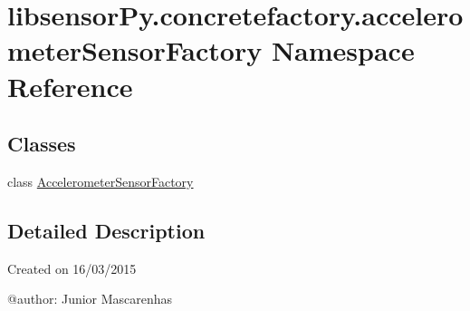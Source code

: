 \hypertarget{namespacelibsensorPy_1_1concretefactory_1_1accelerometerSensorFactory}{}\section{libsensor\+Py.\+concretefactory.\+accelerometer\+Sensor\+Factory Namespace Reference}
\label{namespacelibsensorPy_1_1concretefactory_1_1accelerometerSensorFactory}
\subsection*{Classes}
\begin{DoxyCompactItemize}
\item 
class \hyperlink{classlibsensorPy_1_1concretefactory_1_1accelerometerSensorFactory_1_1AccelerometerSensorFactory}{Accelerometer\+Sensor\+Factory}
\end{DoxyCompactItemize}


\subsection{Detailed Description}
\begin{DoxyVerb}Created on 16/03/2015

@author: Junior Mascarenhas
\end{DoxyVerb}
 